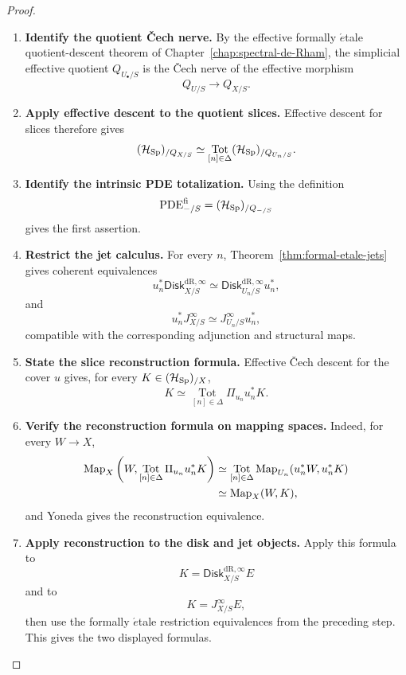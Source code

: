 \begin{proof}
\leavevmode
\begin{enumerate}[label=\textup{(\arabic*)}]
    \item \textbf{Identify the quotient Čech nerve.}
By the effective formally \(\acute{e}\)tale quotient-descent theorem of
Chapter~\ref{chap:spectral-de-Rham}, the simplicial effective quotient
\(Q_{U_\bullet/S}\) is the \v{C}ech nerve of the effective morphism
\[
  Q_{U/S}\longrightarrow Q_{X/S}.
\]

    \item \textbf{Apply effective descent to the quotient slices.}
Effective descent for slices therefore gives
\[
  (\mathcal H_{\operatorname{Sp}})_{/Q_{X/S}}
  \simeq
  \operatorname*{Tot}_{[n]\in\Delta}
  (\mathcal H_{\operatorname{Sp}})_{/Q_{U_n/S}}.
\]

    \item \textbf{Identify the intrinsic PDE totalization.}
Using the definition
\[
  \operatorname{PDE}^{\mathrm{fi}}_{-/S}
  =
  (\mathcal H_{\operatorname{Sp}})_{/Q_{-/S}}
\]
gives the first assertion.

    \item \textbf{Restrict the jet calculus.}
For every \(n\),
Theorem~\ref{thm:formal-etale-jets} gives coherent equivalences
\[
  u_n^*
  \mathsf{Disk}^{\mathrm{dR},\infty}_{X/S}
  \simeq
  \mathsf{Disk}^{\mathrm{dR},\infty}_{U_n/S}u_n^*,
\]
and
\[
  u_n^*J^\infty_{X/S}
  \simeq
  J^\infty_{U_n/S}u_n^*,
\]
compatible with the corresponding adjunction and structural maps.

    \item \textbf{State the slice reconstruction formula.}
Effective \v{C}ech descent for the cover \(u\) gives, for every
\(K\in(\mathcal H_{\operatorname{Sp}})_{/X}\),
\[
  K
  \simeq
  \operatorname*{Tot}_{[n]\in\Delta}
  \Pi_{u_n}u_n^*K.
\]

    \item \textbf{Verify the reconstruction formula on mapping spaces.}
Indeed, for every \(W\to X\),
\[
\begin{aligned}
  \operatorname{Map}_X
  \left(
    W,
    \operatorname*{Tot}_{[n]\in\Delta}
    \Pi_{u_n}u_n^*K
  \right)
  &\simeq
  \operatorname*{Tot}_{[n]\in\Delta}
  \operatorname{Map}_{U_n}(u_n^*W,u_n^*K)\\
  &\simeq
  \operatorname{Map}_X(W,K),
\end{aligned}
\]
and Yoneda gives the reconstruction equivalence.

    \item \textbf{Apply reconstruction to the disk and jet objects.}
Apply this formula to
\[
  K=\mathsf{Disk}^{\mathrm{dR},\infty}_{X/S}E
\]
and to
\[
  K=J^\infty_{X/S}E,
\]
then use the formally \(\acute{e}\)tale restriction equivalences from the
preceding step. This gives the two displayed formulas.


\end{enumerate}
\end{proof}
